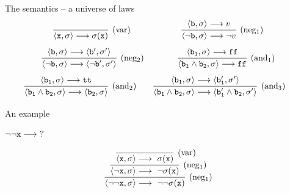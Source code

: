 \documentclass{beamer}
\begin{document}
\begin{frame}{The semantics -- a universe of laws}
        \[
                \infer[(\text{var})]{\langle \mathtt{x}, \sigma \rangle 
                \longrightarrow \sigma(\mathtt{x})}{} \qquad \qquad
                \qquad
                \infer[(\text{neg$_1$})]{\langle \neg \prog{b}, \sigma \rangle 
                \longrightarrow \neg v}{
                   \pv{\prog{b}}{\sigma} \longrightarrow
                   v
                }
        \] 
        \pause
        \vspace{0.1cm}        
        \[
                \infer[(\text{neg$_2$})]{
                \pv{\neg \prog{b}}{\sigma} 
                \longrightarrow \pv{\neg \prog{b'}}{\sigma'}
                }{
                \pv{\prog{b}}{\sigma} 
                \longrightarrow \pv{\prog{b'}}{\sigma'}
                } \qquad \qquad
                \infer[(\text{and$_1$})]{
                        \pv{\prog{b_1} \wedge \prog{b_2} }{\sigma}
                \longrightarrow \prog{ff}}{
                   \pv{\prog{b_1}}{\sigma} \longrightarrow
                   \prog{ff}
                }
        \] 
        \vspace{0.1cm}
        \[
                \hspace{-0.3cm}
                \infer[(\text{and$_2$})]{
                \pv{ \prog{b_1} \wedge \prog{b_2} }{ \sigma }
                \longrightarrow 
                \pv{ \prog{b_2} }{\sigma}  }
                {
                   \pv{\prog{b_1}}{\sigma} \longrightarrow
                   \prog{tt}
                }
                \qquad 
                \infer[(\text{and$_3$})]{
                        \pv{\prog{b_1} \wedge \prog{b_2} }{\sigma}
                \longrightarrow \pv{\prog{b_1'} \wedge \prog{b_2}}{\sigma'} }{
                   \pv{\prog{b_1}}{\sigma} \longrightarrow
                   \pv{\prog{b_1'}}{\sigma'}
                }
        \] 
        \vfill
\end{frame}

\begin{frame}{An example}

        $\neg \neg \mathtt{x} \longrightarrow\ ?$

        \pause
        \centering
        \[
                \infer[(\text{neg$_1$})]{
                        \pv{\neg \neg \prog{x}}{\sigma}
                        \longrightarrow\ \neg \neg \sigma(\prog{x})
                }{
                        \infer[(\text{neg$_1$})]{
                                \pv{\neg \prog{x}}{\sigma}
                                \longrightarrow\ \neg \sigma(\prog{x})
                        }{
                                \infer[(\text{var})]{ 
                                \pv{\prog{x}}{\sigma} \longrightarrow\  \sigma(\prog{x})
                                }{
                                }
                        }
                }
        \]
\end{frame}
\end{document}
